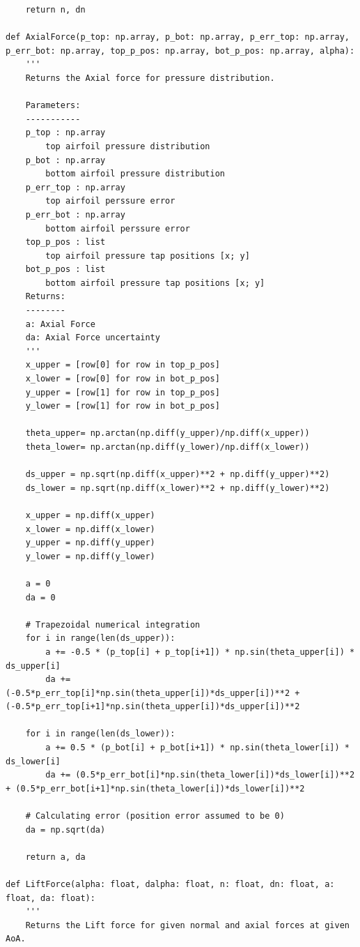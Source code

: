 \documentclass[11pt, letterpaper]{article}
\begin{document}
\begin{appendices}
\begin{verbatim}
    return n, dn

def AxialForce(p_top: np.array, p_bot: np.array, p_err_top: np.array, p_err_bot: np.array, top_p_pos: np.array, bot_p_pos: np.array, alpha):
    '''
    Returns the Axial force for pressure distribution.

    Parameters:
    -----------   
    p_top : np.array
        top airfoil pressure distribution
    p_bot : np.array
        bottom airfoil pressure distribution
    p_err_top : np.array
        top airfoil perssure error
    p_err_bot : np.array
        bottom airfoil perssure error
    top_p_pos : list
        top airfoil pressure tap positions [x; y]
    bot_p_pos : list
        bottom airfoil pressure tap positions [x; y]
    Returns:
    --------
    a: Axial Force
    da: Axial Force uncertainty
    '''
    x_upper = [row[0] for row in top_p_pos]
    x_lower = [row[0] for row in bot_p_pos]
    y_upper = [row[1] for row in top_p_pos]
    y_lower = [row[1] for row in bot_p_pos]
    
    theta_upper= np.arctan(np.diff(y_upper)/np.diff(x_upper))
    theta_lower= np.arctan(np.diff(y_lower)/np.diff(x_lower))
    
    ds_upper = np.sqrt(np.diff(x_upper)**2 + np.diff(y_upper)**2)
    ds_lower = np.sqrt(np.diff(x_lower)**2 + np.diff(y_lower)**2)
    
    x_upper = np.diff(x_upper)
    x_lower = np.diff(x_lower)
    y_upper = np.diff(y_upper)
    y_lower = np.diff(y_lower)

    a = 0
    da = 0

    # Trapezoidal numerical integration
    for i in range(len(ds_upper)):
        a += -0.5 * (p_top[i] + p_top[i+1]) * np.sin(theta_upper[i]) * ds_upper[i]
        da += (-0.5*p_err_top[i]*np.sin(theta_upper[i])*ds_upper[i])**2 + (-0.5*p_err_top[i+1]*np.sin(theta_upper[i])*ds_upper[i])**2
    
    for i in range(len(ds_lower)):
        a += 0.5 * (p_bot[i] + p_bot[i+1]) * np.sin(theta_lower[i]) * ds_lower[i]
        da += (0.5*p_err_bot[i]*np.sin(theta_lower[i])*ds_lower[i])**2 + (0.5*p_err_bot[i+1]*np.sin(theta_lower[i])*ds_lower[i])**2
    
    # Calculating error (position error assumed to be 0)
    da = np.sqrt(da)
    
    return a, da

def LiftForce(alpha: float, dalpha: float, n: float, dn: float, a: float, da: float):
    '''
    Returns the Lift force for given normal and axial forces at given AoA.


\end{verbatim}
\end{appendices}
\end{document}
